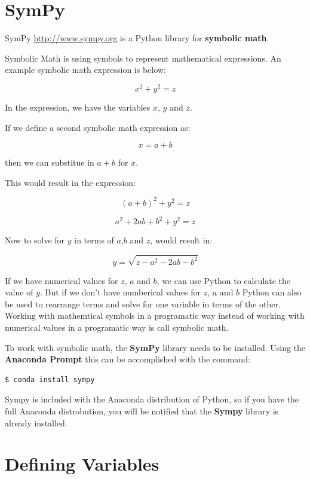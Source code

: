\documentclass{book}
\begin{document}
    \section{SymPy}\label{sympy}

    SymPy \url{http://www.sympy.org} is a Python library for
\textbf{symbolic math}.

Symbolic Math is using symbols to represent mathematical expressions. An
example symbolic math expression is below:

    \[ x^{2} + y^{2} = z \]

    In the expression, we have the variables \(x\), \(y\) and \(z\).

    If we define a second symbolic math expression as:

    \[ x = a + b \]

    then we can substitue in \(a + b\) for \(x\).

    This would result in the expression:

    \[ (a + b)^{2} + y^{2} = z \]

\[ a^{2} + 2ab + b^{2} + y^{2} = z \]

    Now to solve for \(y\) in terms of \(a\),\(b\) and \(z\), would result
in:

\[ y = \sqrt{z - a^{2} - 2ab - b^{2}} \]

    If we have numerical values for \(z\), \(a\) and \(b\), we can use
Python to calculate the value of \(y\). But if we don't have numberical
values for \(z\), \(a\) and \(b\) Python can also be used to rearrange
terms and solve for one variable in terms of the other. Working with
mathemtical symbols in a programatic way instead of working with
numerical values in a programatic way is call symbolic math.

    To work with symbolic math, the \textbf{SymPy} library needs to be
installed. Using the \textbf{Anaconda Prompt} this can be accomplished
with the command:

\begin{lstlisting}[language=bash]
$ conda install sympy
\end{lstlisting}

    Sympy is included with the Anaconda distribution of Python, so if you
have the full Anaconda distrobution, you will be notified that the
\textbf{Sympy} library is already installed.

    \section{Defining Variables}\label{defining-variables}
\end{document}
